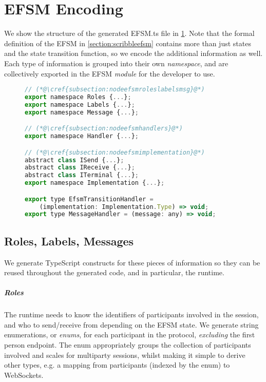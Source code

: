 \section{EFSM Encoding}
\label{section:nodeefsm}

We show the structure of the generated EFSM.ts file in
\cref{lst:nodeefsmfile}.
Note that the formal definition of the EFSM in 
\cref{section:scribbleefsm}
contains more than just states and the state transition function,
so we encode the additional information as well.
Each type of information is grouped into their own
\textit{namespace}, and are collectively exported in
the EFSM \textit{module} for the developer to use.

\begin{figure}
\begin{lstlisting}[language=javascript,tabsize=2,title=EFSM.ts]
// (*@\cref{subsection:nodeefsmroleslabelsmsg}@*)
export namespace Roles {...};
export namespace Labels {...};
export namespace Message {...};

// (*@\cref{subsection:nodeefsmhandlers}@*)
export namespace Handler {...};

// (*@\cref{subsection:nodeefsmimplementation}@*)
abstract class ISend {...};
abstract class IReceive {...};
abstract class ITerminal {...};
export namespace Implementation {...};

export type EfsmTransitionHandler =
	(implementation: Implementation.Type) => void;
export type MessageHandler = (message: any) => void;
\end{lstlisting}
\label{lst:nodeefsmfile}
\end{figure}

\subsection{Roles, Labels, Messages}
\label{subsection:nodeefsmroleslabelsmsg}

We generate TypeScript constructs for these pieces of information
so they can be reused throughout the generated code, 
and in particular, the runtime.

\subparagraph{Roles}
The runtime needs to know the identifiers of participants involved
in the session, and who to send/receive from 
depending on the EFSM state.
We generate string enumerations, or \textit{enums}, for each 
participant in the protocol, \textit{excluding} the 
first person endpoint. 
The enum appropriately groups the collection
of participants involved and scales for multiparty sessions,
whilst making it simple to derive other types, e.g. a mapping from
participants (indexed by the enum) to WebSockets.

